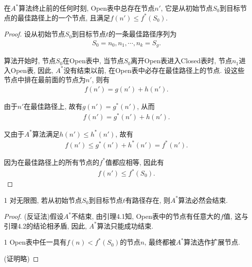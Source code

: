 \begin{mylem}{}{}\label{AIlem002}
    在$A^*$算法终止前的任何时刻, Open表中总存在节点$n'$, 它是从初始节点$S_0$到目标节点的最佳路径上的一个节点, 且满足$f(n')\leq f^*(S_0)$.
\end{mylem}
\begin{proof}
    设从初始节点$S_0$到目标节点$t$的一条最佳路径序列为
\begin{align}
    S_0= n_0, n_1, \cdots , n_k=S_g.
\end{align}

算法开始时, 节点$S_0$在Open表中, 当节点$S_0$离开Open表进入Closed表时, 节点$n_1$进入Open表, 因此, $A^*$没有结束以前, 在Open表中必存在最佳路径上的节点. 设这些节点中排在最前面的节点为$n'$, 则有
\begin{align}
    f(n')=g(n')+h(n').
\end{align}

由于$n'$在最佳路径上, 故有$g(n')=g^*(n')$, 从而
\begin{align}
    f(n')=g^*(n')+h(n').
\end{align}

又由于$A^*$算法满足$h(n')\leq h^*(n')$, 故有
\begin{align}
    f(n')\leq g^*(n')+h^*(n')=f^*(n').
\end{align}

因为在最佳路径上的所有节点的$f^*$值都应相等, 因此有
\begin{align}
    f(n')\leq f^*(S_0).
\end{align}
\end{proof}
\begin{mythm}{}{1}\label{Thm402}
    对无限图, 若从初始节点$S_0$到目标节点$t$有路径存在, 则$A^*$算法必然会结束.
\end{mythm}
\begin{proof}
(反证法)假设$A^*$不结束, 由引理4.1知, Open表中的节点有任意大的$f$值, 这与引理4.2的结论相矛盾, 因此, $A^*$算法只能成功结束.

\begin{myprop}{}{1}
    Open表中任一具有$f(n)<f^*(S_0)$的节点$n$, 最终都被$A^*$算法选作扩展节点.
\end{myprop}
(证明略)
\end{proof}

